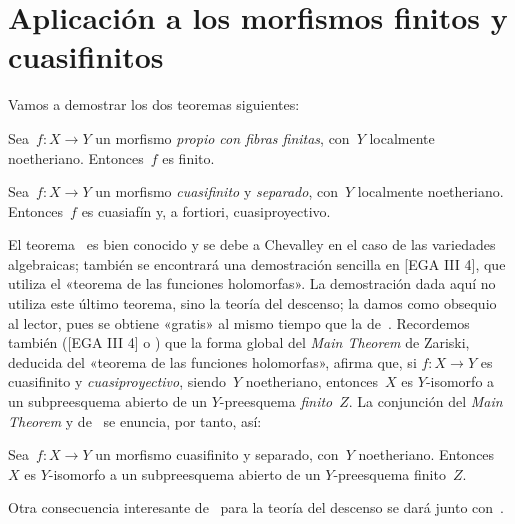 \section[Aplicación a los morfismos finitos y cuasifinitos]{Aplicación a los morfismos finitos y cuasifinitos\protect\footnotemark}
\label{VIII.6}

Vamos a demostrar los dos teoremas siguientes:

\begin{theoreme}
\label{VIII.6.1}
Sea~$f\colon X\to Y$ un morfismo \emph{propio con fibras finitas}, con~$Y$
localmente noetheriano. Entonces~$f$ es finito.
\end{theoreme}

\begin{theoreme}
\label{VIII.6.2}
Sea~$f\colon X\to Y$ un morfismo \emph{cuasifinito} y \emph{separado},
con~$Y$ localmente noetheriano. Entonces~$f$ es cuasiafín y, a fortiori,
cuasiproyectivo.
\end{theoreme}

\begin{remarques}
\label{VIII.6.3}
El
teorema~ es bien conocido y se debe a Chevalley en el caso de
las variedades algebraicas; también se encontrará una demostración sencilla
en [EGA III 4], que utiliza el «teorema de las funciones holomorfas». La
demostración dada aquí no utiliza este último teorema, sino la teoría del
descenso; la damos como obsequio al lector, pues se obtiene «gratis» al mismo
tiempo que la de~. Recordemos también ([EGA III 4] o
\cite{VIII.1}) que la forma global del \emph{Main Theorem} de Zariski,
deducida del «teorema de las funciones holomorfas», afirma que, si
$f\colon X\to Y$ es cuasifinito y \emph{cuasiproyectivo}, siendo~$Y$
noetheriano, entonces~$X$ es $Y$-isomorfo a un subpreesquema abierto de un
$Y$-preesquema \emph{finito}~$Z$. La conjunción del \emph{Main Theorem} y
de~ se enuncia, por tanto, así:
\end{remarques}

\begin{corollaire}
\label{VIII.6.4}
Sea~$f\colon X\to Y$ un morfismo cuasifinito y separado, con~$Y$
noetheriano. Entonces~$X$ es $Y$-isomorfo a un subpreesquema abierto de un
$Y$-preesquema finito~$Z$.
\end{corollaire}

Otra consecuencia interesante de~ para la teoría del descenso
se dará junto con~.

